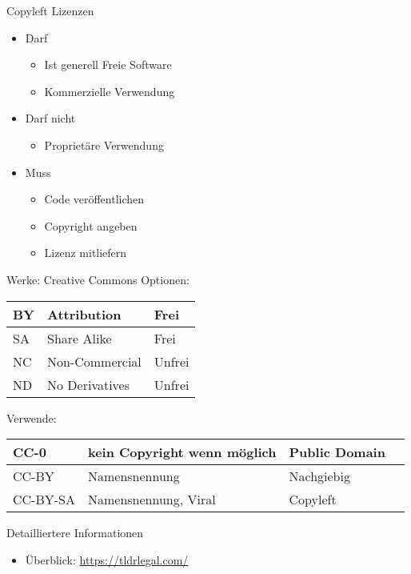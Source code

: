 \begin{frame}{Copyleft Lizenzen}
	\begin{itemize}
		\item Darf
		\begin{itemize}
			\item Ist generell Freie Software
			\item Kommerzielle Verwendung
		\end{itemize}
		\item Darf nicht
		\begin{itemize}
			\item Proprietäre Verwendung
		\end{itemize}
		\item Muss
		\begin{itemize}
			\item Code veröffentlichen
			\item Copyright angeben
			\item Lizenz mitliefern
		\end{itemize}
	\end{itemize}
\end{frame}

\begin{frame}{Werke: Creative Commons}
	Optionen:\\
	\begin{tabular}{|l|l|l|}
		\hline
		BY	& Attribution		& Frei\\
		\hline
		SA	& Share Alike		& Frei\\
		\hline
		NC	& Non-Commercial	& Unfrei\\
		\hline
		ND	& No Derivatives	& Unfrei\\
		\hline
	\end{tabular} 
	
	Verwende:\\
	\begin{tabular}{|l|l|l|l|}
		\hline
		CC-0		& kein Copyright wenn möglich & Public Domain\\
		\hline
		CC-BY		& Namensnennung & Nachgiebig\\
		\hline
		CC-BY-SA	& Namensnennung, Viral & Copyleft\\
		\hline
	\end{tabular} 
\end{frame}


\begin{frame}{Detailliertere Informationen}
	\begin{itemize}
		\item Überblick: \url{https://tldrlegal.com/}
	\end{itemize}
\end{frame}
